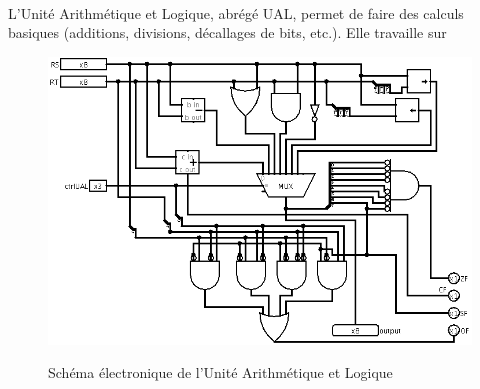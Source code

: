 \paragraph{}{
	L'Unité Arithmétique et Logique, abrégé UAL, permet de faire des calculs
	basiques (additions, divisions, décallages de bits, etc.). Elle travaille
	sur 
}

\begin{figure}
	\centering
	\includegraphics[scale=0.5,origin=c]{circuits/UAL.png}
	\label{ual_circ}
	\caption{Sch\'{e}ma \'{e}lectronique de l'Unit\'{e} Arithm\'{e}tique et Logique}
\end{figure}